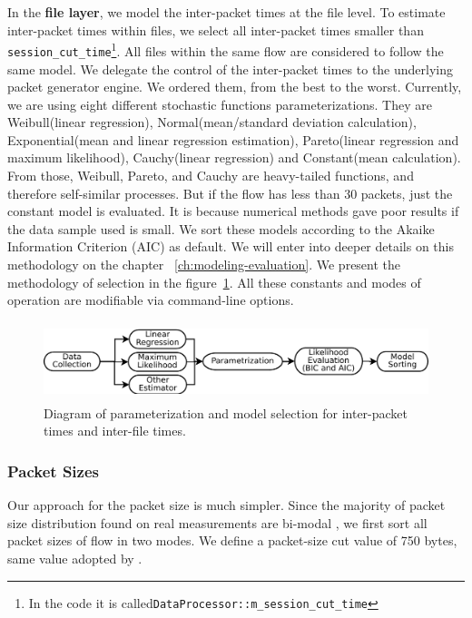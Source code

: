 In the \textbf{file layer}, we model the inter-packet times at the file level. To estimate inter-packet times within files, we select all inter-packet times smaller than \texttt{session\_cut\_time}\footnote{In the code it is called\texttt{DataProcessor::m\_session\_cut\_time} }. All files within the same flow are considered to follow the same model. We delegate the control of the inter-packet times to the underlying packet generator engine. We ordered them, from the best to the worst. Currently, we are using eight different stochastic functions parameterizations. They are Weibull(linear regression), Normal(mean/standard deviation calculation), Exponential(mean and linear regression estimation), Pareto(linear regression and maximum likelihood), Cauchy(linear regression) and Constant(mean calculation). From those, Weibull, Pareto, and Cauchy are heavy-tailed functions, and therefore self-similar processes. But if the flow has less than 30 packets, just the constant model is evaluated. It is because numerical methods gave poor results if the data sample used is small. We sort these models according to the Akaike Information Criterion (AIC) as default\cite{sourcesonoff-paper}\cite{bic-aic-comparision}. We will enter into deeper details on this methodology on the chapter ~\ref{ch:modeling-evaluation}. We present the methodology of selection in the figure~\ref{fig:model-parameterization}. All these constants and modes of operation are modifiable via command-line options.


\begin{figure}[ht!]
    \centering
    \includegraphics[height=0.9in]{figures/ch3/simitar-parametrization}
    \caption{Diagram of parameterization and model selection for inter-packet times and inter-file times.}
    \label{fig:model-parameterization}
\end{figure}


\subsubsection{Packet Sizes}



Our approach for the packet size is much simpler. Since the majority of packet size distribution found on real measurements are bi-modal \cite{packet-distribution-model}\cite{sourcesonoff-paper}\cite{udp-flows-model}, we first sort all packet sizes of flow in two modes. We define a packet-size cut value of 750 bytes, same value adopted by \cite{udp-flows-model}. 


